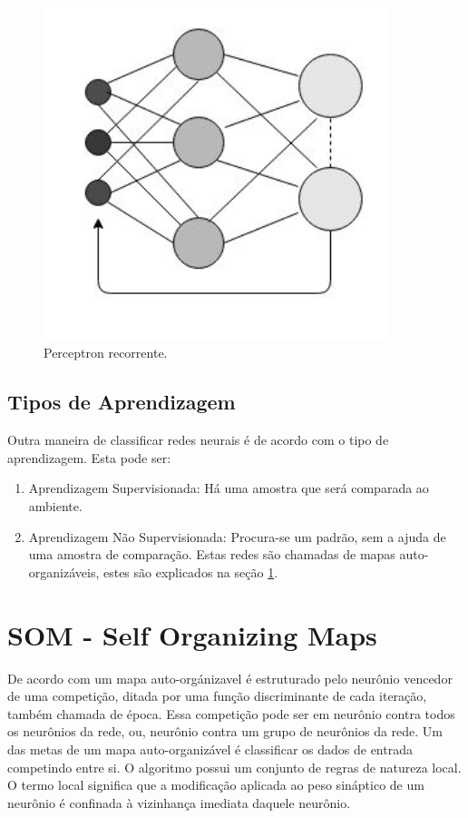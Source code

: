 \begin {enumerate}
\begin{figure}[H]
\centering %
\includegraphics[width=10cm]{img/rnarea.jpg} %
\caption{Perceptron recorrente.}
\label{fig:annrec}
\end{figure}


\end{enumerate}

\subsection{Tipos de Aprendizagem}
\label{sec:lear}
Outra maneira de classificar redes neurais é de acordo com o tipo de aprendizagem. Esta pode ser:
\begin {enumerate}
\item Aprendizagem Supervisionada: Há uma amostra  que será comparada ao ambiente.
\item Aprendizagem Não Supervisionada: Procura-se um padrão, sem a ajuda de uma amostra de comparação. Estas redes são chamadas de mapas auto-organizáveis, estes são explicados na seção \ref{sec:som}.
\end {enumerate}


\section {SOM - Self Organizing Maps}
\label{sec:som}
\quad  De acordo com \cite{ia}  um mapa auto-orgánizavel é estruturado pelo neurônio vencedor de uma competição, ditada por uma função discriminante de cada iteração, também chamada de época. Essa competição pode ser em neurônio contra todos os neurônios da rede, ou, neurônio contra um grupo de neurônios da rede. Um das metas de um mapa auto-organizável é classificar os dados de entrada competindo entre si. O algoritmo possui um conjunto de regras de natureza local. O termo local significa que a modificação aplicada ao peso sináptico de um neurônio é confinada à vizinhança imediata daquele neurônio.

